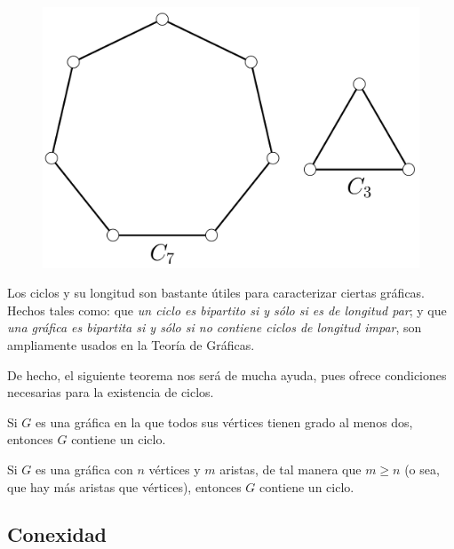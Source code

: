 \begin{figure}[h]
    \centering
    \includegraphics[scale=0.15]{img/imgchapter1/Ciclos.jpg}
    \caption{}
    \label{fig:ciclos}
\end{figure}

Los ciclos y su longitud son bastante útiles para caracterizar ciertas gráficas. Hechos tales como: que \textit{un ciclo es bipartito si y sólo si es de longitud par}; y que \textit{una gráfica es bipartita si y sólo si no contiene ciclos de longitud impar}, son ampliamente usados en la Teoría de Gráficas.

De hecho, el siguiente teorema nos será de mucha ayuda, pues ofrece condiciones necesarias para la existencia de ciclos.

\begin{teo} \label{teo:ciclos}  
Si $G$ es una gráfica en la que todos sus vértices tienen grado al menos dos, entonces $G$ contiene un ciclo.
\end{teo}

\begin{teo} \label{teo: ciclos2}
Si $G$ es una gráfica con $n$ vértices y $m$ aristas, de tal manera que $m \geq n$ (o sea, que hay más aristas que vértices), entonces $G$ contiene un ciclo.
\end{teo}


        \subsection{Conexidad} \label{sec:conexidad}
 

